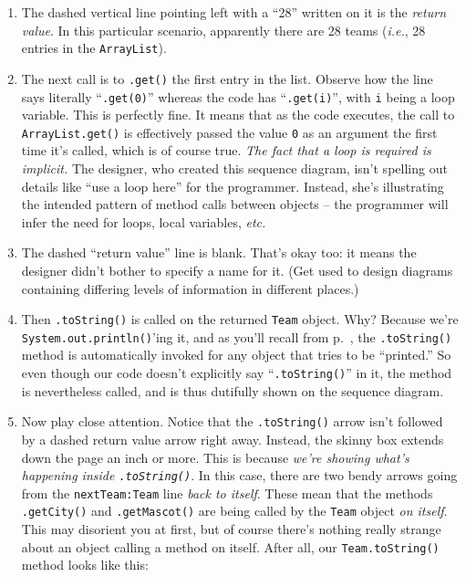 \begin{enumerate}
\itemsep.1em

\item The dashed vertical line pointing left with a ``28'' written on it is the
\textit{return value}. In this particular scenario, apparently there are 28
teams (\textit{i.e.}, 28 entries in the \texttt{ArrayList}).

\item The next call is to \texttt{.get()} the first entry in the list. Observe
how the line says literally ``\texttt{.get(0)}'' whereas the code has
``\texttt{.get(i)}'', with \texttt{i} being a loop variable. This is perfectly
fine. It means that as the code executes, the call to \texttt{ArrayList.get()}
is effectively passed the value \texttt{0} as an argument the first time it's
called, which is of course true. \textit{The fact that a loop is required is
implicit.} The designer, who created this sequence diagram, isn't spelling out
details like ``use a loop here'' for the programmer. Instead, she's
illustrating the intended pattern of method calls between objects -- the
programmer will infer the need for loops, local variables, \textit{etc.}

\item The dashed ``return value'' line is blank. That's okay too: it means the
designer didn't bother to specify a name for it. (Get used to design diagrams
containing differing levels of information in different places.)

\item Then \texttt{.toString()} is called on the returned \texttt{Team}
object. Why? Because we're \texttt{System.out.println()}'ing it, and as you'll
recall from p.~\pageref{pg:toString}, the \texttt{.toString()} method is
automatically invoked for any object that tries to be ``printed.'' So even
though our code doesn't explicitly say ``\texttt{.toString()}'' in it, the
method is nevertheless called, and is thus dutifully shown on the sequence
diagram.

\item Now play close attention. Notice that the \texttt{.toString()} arrow
isn't followed by a dashed return value arrow right away. Instead, the skinny
box extends down the page an inch or more. This is because \textit{we're
showing what's happening inside \texttt{.toString()}}. In this case, there are
two bendy arrows going from the \texttt{nextTeam:Team} line \textit{back to
itself}. These mean that the methods \texttt{.getCity()} and
\texttt{.getMascot()} are being called by the \texttt{Team} object \textit{on
itself}. This may disorient you at first, but of course there's nothing really
strange about an object calling a method on itself. After all, our
\texttt{Team.toString()} method looks like this:


\end{enumerate}
